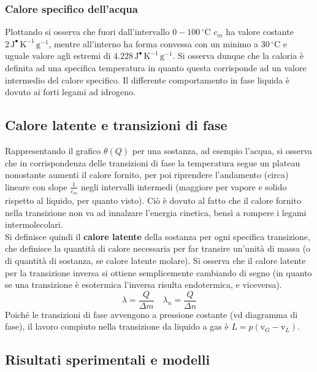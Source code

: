\documentclass[10pt, oneside]{book}
\newcommand{\celsius}{\, \mathrm{{}^\circ C}}
\newcommand{\kelvin}[1]{\, \mathrm{K^{#1}}}
\newcommand{\joule}[1]{\, \mathrm{J^{#1}}}
\newcommand{\molvol}{\mathrm{v}}
\newcommand{\grams}[1]{\, \mathrm{g^{#1}}}
\newcommand{\ds}{\displaystyle}
\begin{document}
\subsubsection{Calore specifico dell'acqua}
Plottando si osserva che fuori dall'intervallo $0-100 \celsius$ $c_m$ ha valore costante $2 \joule{•} \kelvin{-1} \grams{-1}$, mentre all'interno ha forma convessa con un minimo a $30 \celsius$ e uguale valore agli estremi di $4.228 \joule{•} \kelvin{-1} \grams{-1}$. Si osserva dunque che la caloria è definita ad una specifica temperatura in quanto questa corrisponde ad un valore intermedio del calore specifico. Il differente comportamento in fase liquida è dovuto ai forti legami ad idrogeno.

\subsection{Calore latente e transizioni di fase}
Rappresentando il grafico $\theta(Q)$ per una sostanza, ad esempio l'acqua, si osserva che in corrispondenza delle transizioni di fase la temperatura segue un plateau nonostante aumenti il calore fornito, per poi riprendere l'andamento (circa) lineare con slope $\ds \frac{1}{c_m}$ negli intervalli intermedi (maggiore per vapore e solido rispetto al liquido, per quanto visto). Ciò è dovuto al fatto che il calore fornito nella transizione non va ad innalzare l'energia cinetica, bensì a rompere i legami intermolecolari.\\
Si definisce quindi il \textbf{calore latente} della sostanza per ogni specifica transizione, che definisce la quantità di calore necessaria per far transire un'unità di massa (o di quantità di sostanza, se calore latente molare). Si osserva che il calore latente per la transizione inversa si ottiene semplicemente cambiando di segno (in quanto se una transizione è esotermica l'inversa risulta endotermica, e viceversa).
\[\lambda = \frac{Q}{\Delta m} \quad \lambda_n = \frac{Q}{\Delta n}\]
Poiché le transizioni di fase avvengono a pressione costante (vd diagramma di fase), il lavoro compiuto nella transizione da liquido a gas è $\ds L = p (\molvol_G - \molvol_L)$.

\subsection{Risultati sperimentali e modelli}
\end{document}
